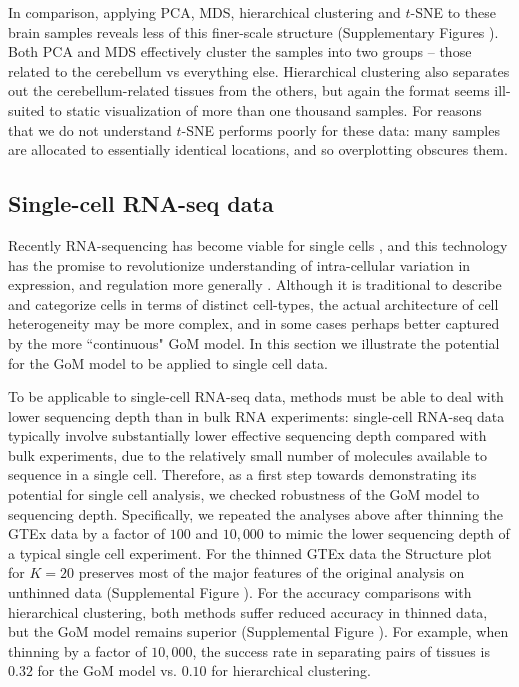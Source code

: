 \documentclass[10pt,letterpaper]{article}
\begin{document}
In comparison, applying PCA, MDS, hierarchical clustering and $t$-SNE to these brain samples reveals less of this finer-scale structure (Supplementary Figures ). Both PCA and MDS effectively cluster the samples into two groups -- those related to the cerebellum vs everything else.
Hierarchical clustering also separates out the cerebellum-related tissues from the others, but again the format seems ill-suited to static
visualization of more than one thousand samples.  For reasons that we do not understand $t$-SNE performs poorly for these data: many samples are allocated to essentially identical locations, and so overplotting obscures them.


\subsection*{Single-cell RNA-seq data}

Recently RNA-sequencing has become viable for single cells \cite{Tang2009}, and this technology has the promise to revolutionize understanding of intra-cellular variation in expression, and regulation more generally \cite{Trapnell2015}. Although it is traditional to describe and categorize cells in terms of distinct cell-types,
the actual architecture of cell heterogeneity may be more complex, and in some cases perhaps better captured by the more ``continuous"  GoM model. In this section we illustrate the potential for the GoM model to be applied to single cell data.

To be applicable to single-cell RNA-seq data, methods must be able to deal with lower sequencing depth than in bulk RNA experiments:
 single-cell RNA-seq data typically involve substantially lower effective sequencing depth compared with bulk experiments, due to the relatively small number of molecules available to sequence in a single cell. Therefore, as a first step towards demonstrating its potential for single cell analysis, we checked robustness of the GoM model to sequencing depth. Specifically, we repeated the analyses above after thinning the GTEx data by a factor of $100$ and $10,000$ to mimic the lower sequencing depth of a typical single cell experiment. For the thinned GTEx data the Structure plot for $K=20$ preserves most of the major features of the original analysis on unthinned data (Supplemental Figure ). For the accuracy comparisons with hierarchical clustering, both methods suffer reduced accuracy in thinned data, but the GoM model remains superior (Supplemental Figure ). For example, when thinning by a factor of $10,000$, the success rate in separating pairs of tissues is $0.32$ for the GoM model vs. $0.10$ for hierarchical clustering.
\end{document}
